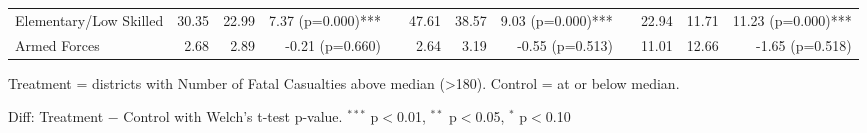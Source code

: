 \begin{table}[htbp]
\begin{tabular}{l rrr c rrr c rrr}
\quad Elementary/Low Skilled & 30.35 & 22.99 & 7.37 (p=0.000)*** &  & 47.61 & 38.57 & 9.03 (p=0.000)*** &  & 22.94 & 11.71 & 11.23 (p=0.000)*** \\
\quad Armed Forces & 2.68 & 2.89 & -0.21 (p=0.660) &  & 2.64 & 3.19 & -0.55 (p=0.513) &  & 11.01 & 12.66 & -1.65 (p=0.518) \\
\bottomrule
\end{tabular}
\begin{tablenotes}
\small
\item Treatment = districts with Number of Fatal Casualties above median (>180). Control = at or below median.
\item Diff: Treatment $-$ Control with Welch's t-test p-value. $^{{***}}$ p$<$0.01, $^{{**}}$ p$<$0.05, $^{{*}}$ p$<$0.10
\end{tablenotes}
\end{table}

\clearpage


